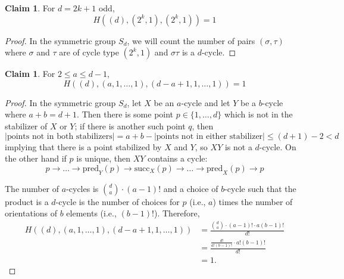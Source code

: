 \documentclass[thesis]{thesis-umich}           %
\theoremstyle{definition}
\newtheorem{claim}[thm]{Claim}
\begin{document}
\begin{claim}
  \label{claim:twosodd}
For $d=2k+1$ odd,
\[
H((d),(2^k,1),(2^k,1))=1
\]
\end{claim}
\begin{proof}
  In the symmetric group $S_d$, we will count the number of pairs $(\sigma,\tau)$ where
  $\sigma$ and $\tau$ are of cycle type $(2^k,1)$ and $\sigma\tau$ is a $d$-cycle.
  \end{proof}

\begin{claim}
  \label{claim:hurwitzdisjoint}
For $2\leq a\leq d-1$,
\[
H((d),(a,1,\dots,1),(d-a+1,1,\dots,1))=1
\]
\end{claim}
\begin{proof}
  In the symmetric group $S_d$, let $X$ be an $a$-cycle and let
  $Y$ be a $b$-cycle where $a+b=d+1$. Then there is some point
  $p\in\{1,\dots,d\}$ which is not in the stabilizer of $X$ or $Y$;
  if there is another such point $q$, then
  \[
  |\text{points not in both stabilizers}|=a+b-|\text{points not in either stabilizer}|\leq (d+1)-2<d
  \]
  implying that there is a point stabilized by $X$ and $Y$, so $XY$ is not a $d$-cycle. On the other hand
  if $p$ is unique, then
  $XY$ contains a cycle:
  \[
  p\to\dots\to \text{pred}_Y(p)\to\text{succ}_X(p)\to\dots\to\text{pred}_X(p)\to p
  \]
  
  The number of $a$-cycles is $\binom da\cdot (a-1)!$
  and a choice of $b$-cycle such that the product is a $d$-cycle is
  the number of choices for $p$ (i.e., $a$) times the number of orientations
  of $b$ elements (i.e., $(b-1)!$). Therefore,
  \begin{align*}
    H((d),(a,1,\dots,1),(d-a+1,1,\dots,1))&=\frac{\binom da\cdot (a-1)!\cdot a(b-1)!}{d!} \\
    &=\frac{\frac{d!}{a!(b-1)!}\cdot a!(b-1)!}{d!} \\
    &=1.
  \end{align*}
  \end{proof}
\end{document}
